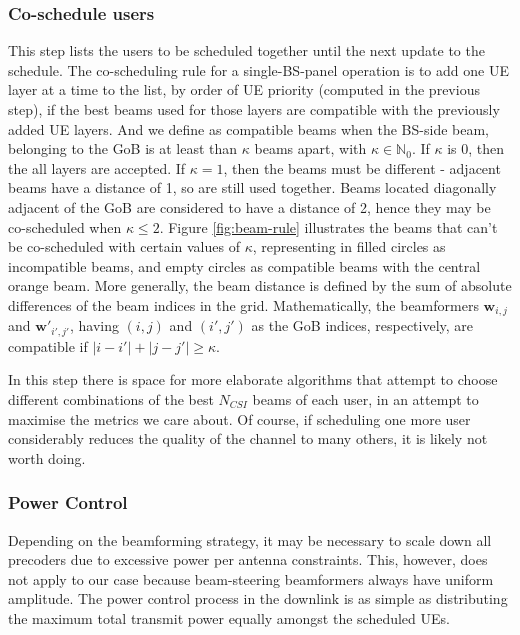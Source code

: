 \subsubsection*{Co-schedule users}
This step lists the users to be scheduled together until the next update to the schedule. The co-scheduling rule for a single-BS-panel operation is to add one UE layer at a time to the list, by order of \ac{UE} priority (computed in the previous step), if the best beams used for those layers are compatible with the previously added \ac{UE} layers. And we define as compatible beams when the BS-side beam, belonging to the \ac{GoB} is at least than $\kappa$ beams apart, with $\kappa \in \mathbb{N}_0$. If $\kappa$ is 0, then the all layers are accepted. If $\kappa = 1$, then the beams must be different - adjacent beams have a distance of 1, so are still used together. Beams located diagonally adjacent of the \ac{GoB} are considered to have a distance of 2, hence they may be co-scheduled when $\kappa \leq 2$. Figure \ref{fig:beam-rule} illustrates the beams that can't be co-scheduled with certain values of $\kappa$, representing in filled circles as incompatible beams, and empty circles as compatible beams with the central orange beam. More generally, the beam distance is defined by the sum of absolute differences of the beam indices in the grid. Mathematically, the beamformers $\bm{w}_{i,j}$ and $\bm{w}'_{i',j'}$, having $(i,j)$ and $(i', j')$ as the GoB indices, respectively, are compatible if $|i-i'| + |j - j'| \geq \kappa$.
    

In this step there is space for more elaborate algorithms that attempt to choose different combinations of the best $N_{CSI}$ beams of each user, in an attempt to maximise the metrics we care about. Of course, if scheduling one more user considerably reduces the quality of the channel to many others, it is likely not worth doing.


\subsubsection*{Power Control}
Depending on the beamforming strategy, it may be necessary to scale down all precoders due to excessive power per antenna constraints. This, however, does not apply to our case because beam-steering beamformers always have uniform amplitude. The power control process in the downlink is as simple as distributing the maximum total transmit power equally amongst the scheduled UEs.
    
